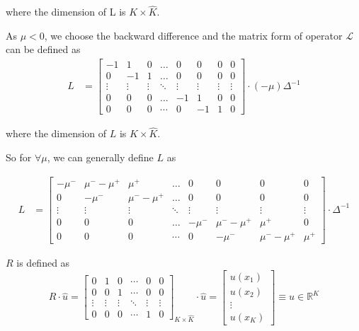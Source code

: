 \documentclass[11pt]{article}
\newcommand{\R}{\ensuremath{\mathbb{R}}}
\begin{document}
where the dimension of L is $K\times\hat{K}$.

As $\mu<0$, we choose the backward difference and the matrix form of operator $\mathcal{L}$ can be defined as
\begin{align}
L &= \begin{bmatrix}
-1&1&0&\dots&0&0&0&0\\
0&-1&1&\dots&0&0&0&0\\
\vdots&\vdots&\vdots&\ddots&\vdots&\vdots&\vdots&\vdots\\
0&0&0&\dots&-1&1&0&0\\
0&0&0&\cdots&0&-1&1&0
\end{bmatrix}\cdot (-\mu)\Delta^{-1}\nonumber
\end{align}

where the dimension of $L$ is $K\times\hat{K}$.

So for $\forall\mu$, we can generally define $L$ as

\begin{align}
L &= \begin{bmatrix}
-\mu^-&\mu^--\mu^+&\mu^+&\dots&0&0&0&0\\
0&-\mu^-&\mu^--\mu^+&\dots&0&0&0&0\\
\vdots&\vdots&\vdots&\ddots&\vdots&\vdots&\vdots&\vdots\\
0&0&0&\dots&-\mu^-&\mu^--\mu^+&\mu^+&0\\
0&0&0&\cdots&0&-\mu^-&\mu^--\mu^+&\mu^+
\end{bmatrix}\cdot \Delta^{-1}\nonumber
\end{align}

$R$ is defined as 
\begin{equation}
R\cdot \hat{u} =\begin{bmatrix}
0&1&0&\cdots&0&0\\
0&0&1&\cdots&0&0\\
\vdots&\vdots&\vdots&\ddots&\vdots&\vdots\\
0&0&0&\cdots&1&0
\end{bmatrix}_{K\times\hat{K}}\cdot \hat{u}		 
=\begin{bmatrix}
u(x_1)\\
u(x_2)\\
\vdots\\
u(x_K)
\end{bmatrix} \equiv u\in \R^{K} 
\end{equation}
\end{document}
